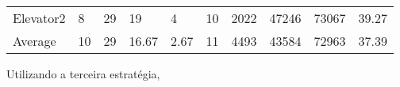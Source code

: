 \documentclass[a4paper]{article}
\begin{document}
\begin{table}[h]
\begin{tabular}{@{}llllllllll@{}}
Elevator2 & 8        & 29            & 19           & 4                                                               & 10                                                                  & 2022                                                         & 47246                                                 & 73067                                                   & 39.27         \\
Average   & 10     & 29         & 16.67        & 2.67                                                               & 11                                                               & 4493                                                         & 43584                                                 & 72963                                                   & 37.39          \\ \bottomrule
\end{tabular}
\end{table}

Utilizando a terceira estratégia,
\end{document}
